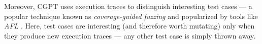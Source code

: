 \documentclass[sigconf,review,anonymous]{acmart}
\begin{document}
%
Moreover, CGPT uses execution traces to distinguish interesting test cases --- a
popular technique known as \emph{coverage-guided fuzzing} and popularized by
tools like \emph{AFL} \cite{afl}.
%
Here, test cases are interesting (and therefore worth mutating) only when they
produce new execution traces --- any other test case is simply thrown away.

\end{document}
